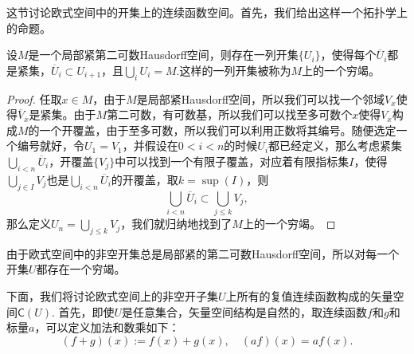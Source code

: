 这节讨论欧式空间中的开集上的连续函数空间。首先，我们给出这样一个拓扑学上的命题。

\begin{thm}
设$M$是一个局部紧第二可数Hausdorff空间，则存在一列开集$\{U_i\}$，使得每个$\overline{U}_i$都是紧集，$\overline{U}_i\subset U_{i+1}$，且$\bigcup_iU_i=M$.这样的一列开集被称为$M$上的一个穷竭。
\end{thm}

\begin{proof}
任取$x\in M$，由于$M$是局部紧Hausdorff空间，所以我们可以找一个邻域$V_x$使得$\overline{V}_x$是紧集。由于$M$第二可数，有可数基，所以我们可以找至多可数个$x$使得$V_x$构成$M$的一个开覆盖，由于至多可数，所以我们可以利用正数将其编号。随便选定一个编号就好，令$U_1=V_1$，并假设在$0<i<n$的时候$U_i$都已经定义，那么考虑紧集$\bigcup_{i<n}\overline{U}_i$，开覆盖$\{V_j\}$中可以找到一个有限子覆盖，对应着有限指标集$I$，使得$\bigcup_{j\in I}V_j$也是$\bigcup_{i<n}\overline{U}_i$的开覆盖，取$k=\sup(I)$，则
\[
	\bigcup_{i<n}\overline{U}_i\subset \bigcup_{j\leq k}V_j,
\]
那么定义$U_n=\bigcup_{j\leq k}V_j$，我们就归纳地找到了$M$上的一个穷竭。
\end{proof}

由于欧式空间中的非空开集总是局部紧的第二可数Hausdorff空间，所以对每一个开集$U$都存在一个穷竭。

下面，我们将讨论欧式空间上的非空开子集$U$上所有的复值连续函数构成的矢量空间$\mathsf{C}(U)$. 首先，即使$U$是任意集合，矢量空间结构是自然的，取连续函数$f$和$g$和标量$a$，可以定义加法和数乘如下：
\[
	(f+g)(x):=f(x)+g(x),\quad (af)(x)=af(x).
\]

